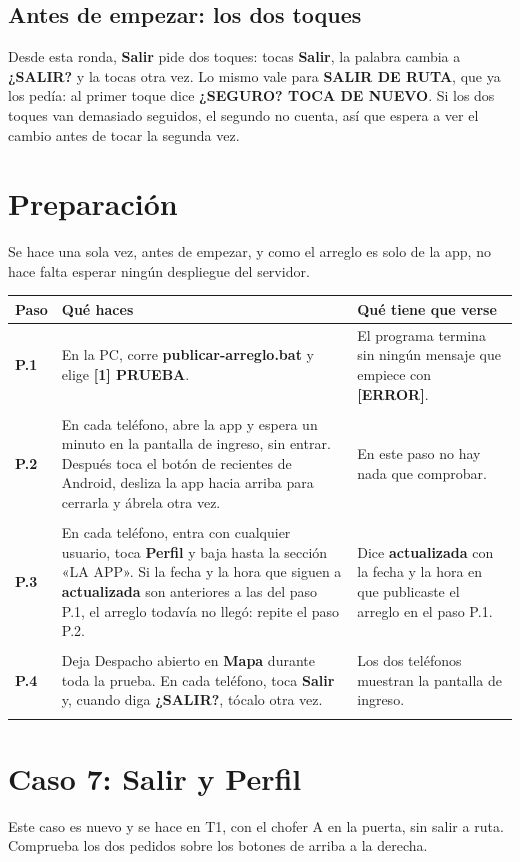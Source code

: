 \documentclass[10pt,a4paper]{article}
\makeatletter
\newcommand{\toca}[1]{\textcolor{azul}{\textbf{#1}}}
\newcommand{\pantalla}[1]{\textcolor{marron}{\textbf{#1}}}
\newcommand{\nada}{\textcolor{tenue}{En este paso no hay nada que comprobar.}}
\newcommand{\caja}[2]{\hbox{\vrule height #1 depth 0pt width 0pt #2}}
\newcommand{\campo}[3]{%
  \raisebox{-0.35\height}{\caja{#3}{\TextField[name=#1, width=#2, height=#3, charsize=8pt, bordercolor={0.55 0.6 0.68},
    backgroundcolor={0.965 0.976 0.992}, multiline=true]{}}}}
\newcommand{\resultado}[1]{%
  \caja{9pt}{\ChoiceMenu[radio, name=resultado-#1, width=9pt, height=9pt, radiosymbol=l,
    bordercolor={0.35 0.38 0.45}, default=]{}{OK=ok,FALLA=falla,NO SE PUDO=nopudo}}}
\newcommand{\paso}[4]{%
  \textbf{#1} & #3 & #4 \\*
  \multicolumn{3}{@{\hspace{6pt}}l@{}}{\rule{0pt}{15pt}\small
    \resultado{#2}\hspace{0.4em}Hora:~\campo{hora-#2}{1.7cm}{13pt}\hspace{1.2em}Nota:~\campo{nota-#2}{8.3cm}{22pt}}\\[3pt]
  \hline
}
\newenvironment{pasos}{%
  \begin{longtable}{@{\hspace{6pt}}>{\raggedright\arraybackslash}p{0.9cm}>{\raggedright\arraybackslash}p{7.9cm}>{\raggedright\arraybackslash}p{7.3cm}@{}}
  \rowcolor{cabecera}\textbf{Paso} & \textbf{Qué haces} & \textbf{Qué tiene que verse} \\ \hline
  \endhead
}{\end{longtable}\vspace{-0.6em}}
\makeatother
\begin{document}
\begin{Form}
\subsection{Antes de empezar: los dos toques}

Desde esta ronda, \toca{Salir} pide dos toques: tocas \toca{Salir}, la palabra cambia a \pantalla{¿SALIR?} y la tocas otra vez. Lo mismo vale para \toca{SALIR DE RUTA}, que ya los pedía: al primer toque dice \pantalla{¿SEGURO? TOCA DE NUEVO}. Si los dos toques van demasiado seguidos, el segundo no cuenta, así que espera a ver el cambio antes de tocar la segunda vez.

\section{Preparación}

Se hace una sola vez, antes de empezar, y como el arreglo es solo de la app, no hace falta esperar ningún despliegue del servidor.

\begin{pasos}
\paso{P.1}{P-1}{En la PC, corre \toca{publicar-arreglo.bat} y elige \toca{[1] PRUEBA}.}{El programa termina sin ningún mensaje que empiece con \pantalla{[ERROR]}.}
\paso{P.2}{P-2}{En cada teléfono, abre la app y espera un minuto en la pantalla de ingreso, sin entrar. Después toca el botón de recientes de Android, desliza la app hacia arriba para cerrarla y ábrela otra vez.}{\nada}
\paso{P.3}{P-3}{En cada teléfono, entra con cualquier usuario, toca \toca{Perfil} y baja hasta la sección «LA APP». Si la fecha y la hora que siguen a \pantalla{actualizada} son anteriores a las del paso P.1, el arreglo todavía no llegó: repite el paso P.2.}{Dice \pantalla{actualizada} con la fecha y la hora en que publicaste el arreglo en el paso P.1.}
\paso{P.4}{P-4}{Deja Despacho abierto en \toca{Mapa} durante toda la prueba. En cada teléfono, toca \toca{Salir} y, cuando diga \pantalla{¿SALIR?}, tócalo otra vez.}{Los dos teléfonos muestran la pantalla de ingreso.}
\end{pasos}

\section{Caso 7: Salir y Perfil}

Este caso es nuevo y se hace en T1, con el chofer A en la puerta, sin salir a ruta. Comprueba los dos pedidos sobre los botones de arriba a la derecha.


\end{Form}
\end{document}
